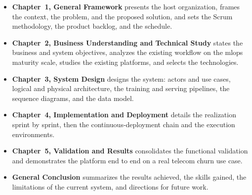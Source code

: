 \begin{itemize}[leftmargin=1.4em]
  \item \textbf{Chapter~1, General Framework} presents the host organization,
        frames the context, the problem, and the proposed solution, and sets
        the Scrum methodology, the product backlog, and the schedule.
  \item \textbf{Chapter~2, Business Understanding and Technical Study} states
        the business and system objectives, analyzes the existing workflow on
        the \gls{mlops} maturity scale, studies the existing platforms, and
        selects the technologies.
  \item \textbf{Chapter~3, System Design} designs the system: actors and use
        cases, logical and physical architecture, the training and serving
        pipelines, the sequence diagrams, and the data model.
  \item \textbf{Chapter~4, Implementation and Deployment} details the
        realization sprint by sprint, then the continuous-deployment chain and
        the execution environments.
  \item \textbf{Chapter~5, Validation and Results} consolidates the functional
        validation and demonstrates the platform end to end on a real telecom
        churn use case.
  \item \textbf{General Conclusion} summarizes the results achieved, the skills
        gained, the limitations of the current system, and directions for future
        work.
\end{itemize}
